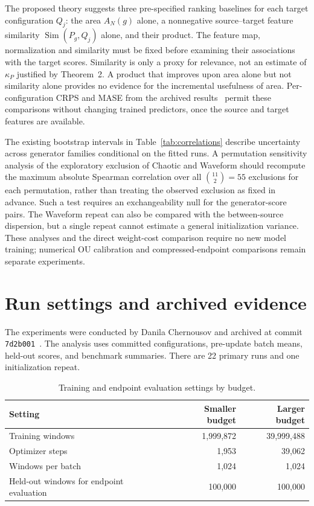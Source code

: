 \documentclass[10pt,a4paper]{article}
\theoremstyle{definition}
\begin{document}
The proposed theory suggests three pre-specified ranking baselines
for each target configuration $Q_j$: the area $A_N(g)$ alone,
a nonnegative source--target feature similarity
$\operatorname{Sim}(P_g,Q_j)$ alone, and their product.
The feature map, normalization and similarity must be fixed before
examining their associations with the target scores. Similarity
is only a proxy for relevance, not an estimate of
$\kappa_P$ justified by Theorem~2. A product that improves upon
area alone but not similarity alone provides no evidence for the
incremental usefulness of area. Per-configuration CRPS and MASE
from the archived results~\cite{chernousovresults} permit these
comparisons without changing trained predictors, once the source
and target features are available.

The existing bootstrap intervals in Table~\ref{tab:correlations}
describe uncertainty across generator families conditional on
the fitted runs. A permutation sensitivity analysis of the
exploratory exclusion of Chaotic and Waveform should recompute
the maximum absolute Spearman correlation over all
$\binom{11}{2}=55$ exclusions for each permutation, rather than
treating the observed exclusion as fixed in advance. Such a test
requires an exchangeability null for the generator-score pairs.
The Waveform repeat can also be compared with the between-source
dispersion, but a single repeat cannot estimate a general
initialization variance. These analyses and the direct weight-cost
comparison require no new model training; numerical OU calibration
and compressed-endpoint comparisons remain separate experiments.





\clearpage
\appendix
\section{Run settings and archived evidence}\label{sec:protocol}
The experiments were conducted by Danila Chernousov and archived at
commit \texttt{7d2b001}~\cite{chernousovresults}. The analysis uses
committed configurations, pre-update batch means, held-out scores, and
benchmark summaries. There are 22 primary runs and one initialization
repeat.

\begin{table}[htbp]
\centering\small
\caption{Training and endpoint evaluation settings by budget.}
\begin{tabular}{@{}lrr@{}}
\toprule
Setting & Smaller budget & Larger budget\\
\midrule
Training windows & 1,999,872 & 39,999,488\\
Optimizer steps & 1,953 & 39,062\\
Windows per batch & 1,024 & 1,024\\
Held-out windows for endpoint evaluation & 100,000 & 100,000\\
\bottomrule
\end{tabular}
\end{table}
\end{document}
